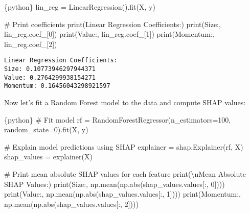 \documentclass[
  letterpaper,
  DIV=11,
  numbers=noendperiod]{scrartcl}
\newenvironment{Shaded}{\begin{snugshade}}{\end{snugshade}}
\newcommand{\BuiltInTok}[1]{\textcolor[rgb]{0.00,0.23,0.31}{#1}}
\newcommand{\CharTok}[1]{\textcolor[rgb]{0.13,0.47,0.30}{#1}}
\newcommand{\CommentTok}[1]{\textcolor[rgb]{0.37,0.37,0.37}{#1}}
\newcommand{\DecValTok}[1]{\textcolor[rgb]{0.68,0.00,0.00}{#1}}
\newcommand{\InformationTok}[1]{\textcolor[rgb]{0.37,0.37,0.37}{#1}}
\newcommand{\NormalTok}[1]{\textcolor[rgb]{0.00,0.23,0.31}{#1}}
\newcommand{\OperatorTok}[1]{\textcolor[rgb]{0.37,0.37,0.37}{#1}}
\newcommand{\StringTok}[1]{\textcolor[rgb]{0.13,0.47,0.30}{#1}}
\begin{document}
\begin{Shaded}
\begin{Highlighting}[]
\InformationTok{\textasciigrave{}\textasciigrave{}\textasciigrave{}\{python\}}
\NormalTok{lin\_reg }\OperatorTok{=}\NormalTok{ LinearRegression().fit(X, y)}

\CommentTok{\# Print coefficients}
\BuiltInTok{print}\NormalTok{(}\StringTok{\textquotesingle{}Linear Regression Coefficients:\textquotesingle{}}\NormalTok{)}
\BuiltInTok{print}\NormalTok{(}\StringTok{\textquotesingle{}Size:\textquotesingle{}}\NormalTok{, lin\_reg.coef\_[}\DecValTok{0}\NormalTok{])}
\BuiltInTok{print}\NormalTok{(}\StringTok{\textquotesingle{}Value:\textquotesingle{}}\NormalTok{, lin\_reg.coef\_[}\DecValTok{1}\NormalTok{])}
\BuiltInTok{print}\NormalTok{(}\StringTok{\textquotesingle{}Momentum:\textquotesingle{}}\NormalTok{, lin\_reg.coef\_[}\DecValTok{2}\NormalTok{])}
\InformationTok{\textasciigrave{}\textasciigrave{}\textasciigrave{}}
\end{Highlighting}
\end{Shaded}

\begin{verbatim}
Linear Regression Coefficients:
Size: 0.10773946297944371
Value: 0.2764299938154271
Momentum: 0.16456043298921597
\end{verbatim}

Now let's fit a Random Forest model to the data and compute SHAP values:

\begin{Shaded}
\begin{Highlighting}[]
\InformationTok{\textasciigrave{}\textasciigrave{}\textasciigrave{}\{python\}}
\CommentTok{\# Fit model}
\NormalTok{rf }\OperatorTok{=}\NormalTok{ RandomForestRegressor(n\_estimators}\OperatorTok{=}\DecValTok{100}\NormalTok{, random\_state}\OperatorTok{=}\DecValTok{0}\NormalTok{).fit(X, y)}

\CommentTok{\# Explain model predictions using SHAP}
\NormalTok{explainer }\OperatorTok{=}\NormalTok{ shap.Explainer(rf, X)}
\NormalTok{shap\_values }\OperatorTok{=}\NormalTok{ explainer(X)}

\CommentTok{\# Print mean absolute SHAP values for each feature}
\BuiltInTok{print}\NormalTok{(}\StringTok{\textquotesingle{}}\CharTok{\textbackslash{}n}\StringTok{Mean Absolute SHAP Values:\textquotesingle{}}\NormalTok{)}
\BuiltInTok{print}\NormalTok{(}\StringTok{\textquotesingle{}Size:\textquotesingle{}}\NormalTok{, np.mean(np.}\BuiltInTok{abs}\NormalTok{(shap\_values.values[:, }\DecValTok{0}\NormalTok{])))}
\BuiltInTok{print}\NormalTok{(}\StringTok{\textquotesingle{}Value:\textquotesingle{}}\NormalTok{, np.mean(np.}\BuiltInTok{abs}\NormalTok{(shap\_values.values[:, }\DecValTok{1}\NormalTok{])))}
\BuiltInTok{print}\NormalTok{(}\StringTok{\textquotesingle{}Momentum:\textquotesingle{}}\NormalTok{, np.mean(np.}\BuiltInTok{abs}\NormalTok{(shap\_values.values[:, }\DecValTok{2}\NormalTok{])))}
\InformationTok{\textasciigrave{}\textasciigrave{}\textasciigrave{}}
\end{Highlighting}
\end{Shaded}
\end{document}
